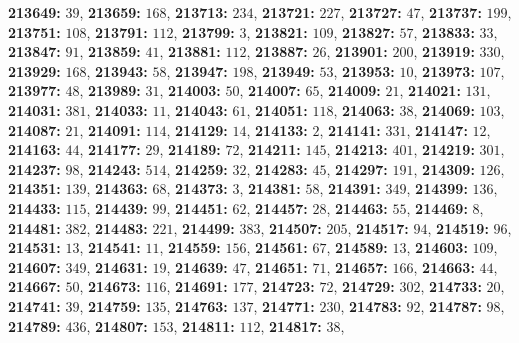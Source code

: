 \textsf{\bfseries 213649:} $39$, \textsf{\bfseries 213659:} $168$, \textsf{\bfseries 213713:} $234$, \textsf{\bfseries 213721:} $227$, \textsf{\bfseries 213727:} $47$, \textsf{\bfseries 213737:} $199$, \textsf{\bfseries 213751:} $108$, \textsf{\bfseries 213791:} $112$, \textsf{\bfseries 213799:} $3$, \textsf{\bfseries 213821:} $109$, \textsf{\bfseries 213827:} $57$, \textsf{\bfseries 213833:} $33$, \textsf{\bfseries 213847:} $91$, \textsf{\bfseries 213859:} $41$, \textsf{\bfseries 213881:} $112$, \textsf{\bfseries 213887:} $26$, \textsf{\bfseries 213901:} $200$, \textsf{\bfseries 213919:} $330$, \textsf{\bfseries 213929:} $168$, \textsf{\bfseries 213943:} $58$, \textsf{\bfseries 213947:} $198$, \textsf{\bfseries 213949:} $53$, \textsf{\bfseries 213953:} $10$, \textsf{\bfseries 213973:} $107$, \textsf{\bfseries 213977:} $48$, \textsf{\bfseries 213989:} $31$, \textsf{\bfseries 214003:} $50$, \textsf{\bfseries 214007:} $65$, \textsf{\bfseries 214009:} $21$, \textsf{\bfseries 214021:} $131$, \textsf{\bfseries 214031:} $381$, \textsf{\bfseries 214033:} $11$, \textsf{\bfseries 214043:} $61$, \textsf{\bfseries 214051:} $118$, \textsf{\bfseries 214063:} $38$, \textsf{\bfseries 214069:} $103$, \textsf{\bfseries 214087:} $21$, \textsf{\bfseries 214091:} $114$, \textsf{\bfseries 214129:} $14$, \textsf{\bfseries 214133:} $2$, \textsf{\bfseries 214141:} $331$, \textsf{\bfseries 214147:} $12$, \textsf{\bfseries 214163:} $44$, \textsf{\bfseries 214177:} $29$, \textsf{\bfseries 214189:} $72$, \textsf{\bfseries 214211:} $145$, \textsf{\bfseries 214213:} $401$, \textsf{\bfseries 214219:} $301$, \textsf{\bfseries 214237:} $98$, \textsf{\bfseries 214243:} $514$, \textsf{\bfseries 214259:} $32$, \textsf{\bfseries 214283:} $45$, \textsf{\bfseries 214297:} $191$, \textsf{\bfseries 214309:} $126$, \textsf{\bfseries 214351:} $139$, \textsf{\bfseries 214363:} $68$, \textsf{\bfseries 214373:} $3$, \textsf{\bfseries 214381:} $58$, \textsf{\bfseries 214391:} $349$, \textsf{\bfseries 214399:} $136$, \textsf{\bfseries 214433:} $115$, \textsf{\bfseries 214439:} $99$, \textsf{\bfseries 214451:} $62$, \textsf{\bfseries 214457:} $28$, \textsf{\bfseries 214463:} $55$, \textsf{\bfseries 214469:} $8$, \textsf{\bfseries 214481:} $382$, \textsf{\bfseries 214483:} $221$, \textsf{\bfseries 214499:} $383$, \textsf{\bfseries 214507:} $205$, \textsf{\bfseries 214517:} $94$, \textsf{\bfseries 214519:} $96$, \textsf{\bfseries 214531:} $13$, \textsf{\bfseries 214541:} $11$, \textsf{\bfseries 214559:} $156$, \textsf{\bfseries 214561:} $67$, \textsf{\bfseries 214589:} $13$, \textsf{\bfseries 214603:} $109$, \textsf{\bfseries 214607:} $349$, \textsf{\bfseries 214631:} $19$, \textsf{\bfseries 214639:} $47$, \textsf{\bfseries 214651:} $71$, \textsf{\bfseries 214657:} $166$, \textsf{\bfseries 214663:} $44$, \textsf{\bfseries 214667:} $50$, \textsf{\bfseries 214673:} $116$, \textsf{\bfseries 214691:} $177$, \textsf{\bfseries 214723:} $72$, \textsf{\bfseries 214729:} $302$, \textsf{\bfseries 214733:} $20$, \textsf{\bfseries 214741:} $39$, \textsf{\bfseries 214759:} $135$, \textsf{\bfseries 214763:} $137$, \textsf{\bfseries 214771:} $230$, \textsf{\bfseries 214783:} $92$, \textsf{\bfseries 214787:} $98$, \textsf{\bfseries 214789:} $436$, \textsf{\bfseries 214807:} $153$, \textsf{\bfseries 214811:} $112$, \textsf{\bfseries 214817:} $38$, 
